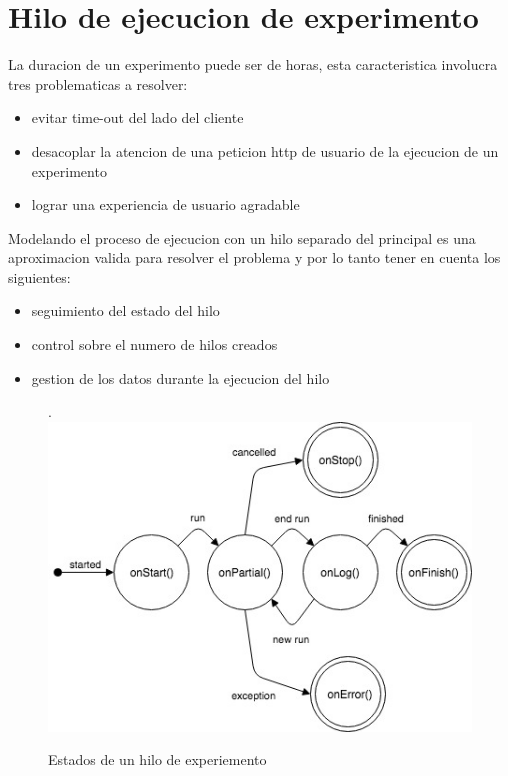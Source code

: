 \section{Hilo de ejecucion de experimento}

La duracion de un experimento puede ser de horas, esta caracteristica involucra tres problematicas
a resolver:

\begin{itemize}
    \item evitar time-out del lado del cliente
    \item desacoplar la atencion de una peticion http de usuario de la ejecucion de un experimento
    \item lograr una experiencia de usuario agradable
\end{itemize}

Modelando el proceso de ejecucion con un hilo separado del principal es una aproximacion
valida para resolver el problema y por lo tanto tener en cuenta los siguientes:

\begin{itemize}
    \item seguimiento del estado del hilo
    \item control sobre el numero de hilos creados
    \item gestion de los datos durante la ejecucion del hilo
\end{itemize}

\begin{figure}[!htb].
    \includegraphics[width=\linewidth]{../figures/d14.jpg}
    \caption{Estados de un hilo de experiemento}
    \label{fig:d14}
\end{figure}

\newpage